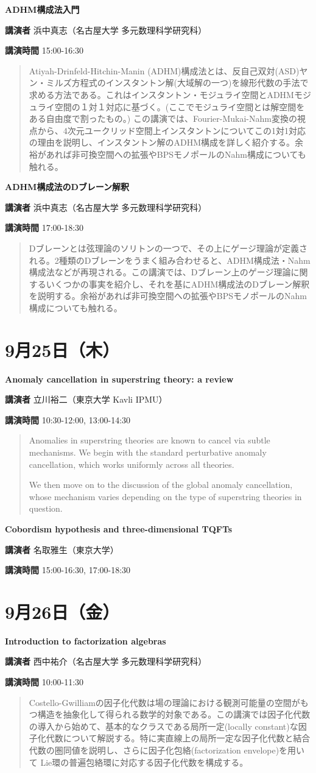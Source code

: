 \documentclass{ltjsarticle}
\theoremstyle{mystyle} %
\numberwithin{equation}{section}
\newcommand{\spkB}{浜中真志}
\newcommand{\spkC}{立川裕二}
\newcommand{\spkD}{名取雅生}
\newcommand{\spkE}{西中祐介}
\newcommand{\instB}{名古屋大学 多元数理科学研究科}
\newcommand{\instC}{東京大学 Kavli IPMU}
\newcommand{\instD}{東京大学}
\newcommand{\instE}{名古屋大学 多元数理科学研究科}
\newcommand{\titleB}{ADHM構成法入門}
\newcommand{\titleBB}{ADHM構成法のDブレーン解釈}
\newcommand{\titleC}{Anomaly cancellation in superstring theory: a review}
\newcommand{\titleD}{Cobordism hypothesis and three-dimensional TQFTs}
\newcommand{\titleE}{Introduction to factorization algebras}
\newcommand{\abst}[5]{
    \Large
    \textbf{#1}
    \normalsize
    
    \vspace{10pt}

    \textbf{講演者} #2（#3）

    \textbf{講演時間} #4

    \vspace{5pt}

    \begin{quote}
        #5
    \end{quote}

    \vspace{10pt}
}
\begin{document}
\abst{\titleB}{\spkB}{\instB}{15:00-16:30}{
    Atiyah-Drinfeld-Hitchin-Manin (ADHM)構成法とは、反自己双対(ASD)ヤン・ミルズ方程式のインスタントン解(大域解の一つ)を線形代数の手法で求める方法である。これはインスタントン・モジュライ空間とADHMモジュライ空間の１対１対応に基づく。(ここでモジュライ空間とは解空間をある自由度で割ったもの。) この講演では、Fourier-Mukai-Nahm変換の視点から、4次元ユークリッド空間上インスタントンについてこの1対1対応の理由を説明し、インスタントン解のADHM構成を詳しく紹介する。余裕があれば非可換空間への拡張やBPSモノポールのNahm構成についても触れる。
}

\abst{\titleBB}{\spkB}{\instB}{17:00-18:30}{
    Dブレーンとは弦理論のソリトンの一つで、その上にゲージ理論が定義される。2種類のDブレーンをうまく組み合わせると、ADHM構成法・Nahm構成法などが再現される。この講演では、Dブレーン上のゲージ理論に関するいくつかの事実を紹介し、それを基にADHM構成法のDブレーン解釈を説明する。余裕があれば非可換空間への拡張やBPSモノポールのNahm構成についても触れる。
}

\newpage

\section*{9月25日（木）}

\abst{\titleC}{\spkC}{\instC}{10:30-12:00, 13:00-14:30}{
    Anomalies in superstring theories are known to cancel via subtle mechanisms. We begin with the standard perturbative anomaly cancellation, which works uniformly across all theories. \\\relax
    
    We then move on to the discussion of the global anomaly cancellation, whose mechanism varies depending on the type of superstring theories in question.
}

\abst{\titleD}{\spkD}{\instD}{15:00-16:30, 17:00-18:30}{
}

\newpage

\section*{9月26日（金）}

\abst{\titleE}{\spkE}{\instE}{10:00-11:30}{
    Costello-Gwilliamの因子化代数は場の理論における観測可能量の空間がもつ構造を抽象化して得られる数学的対象である。この講演では因子化代数の導入から始めて、基本的なクラスである局所一定(locally constant)な因子化代数について解説する。特に実直線上の局所一定な因子化代数と結合代数の圏同値を説明し、さらに因子化包絡(factorization envelope)を用いて Lie環の普遍包絡環に対応する因子化代数を構成する。
}
\end{document}

